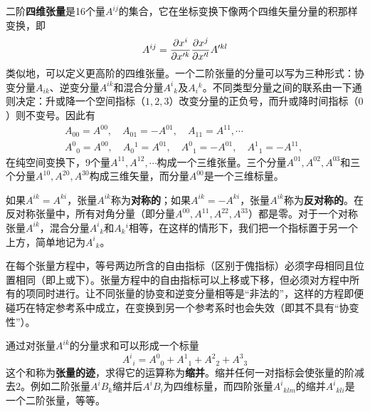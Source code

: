 二阶{\bf 四维张量}是16个量$A^{ij}$的集合，它在坐标变换下像两个四维矢量分量的积那样变换，即
\begin{equation}
	A^{ij} = \frac{\partial x^i}{\partial x'^k} \frac{\partial x^j}{\partial x'^l} A'^{kl}
\end{equation}
类似地，可以定义更高阶的四维张量。一个二阶张量的分量可以写为三种形式：协变分量$A_{ik}$、逆变分量$A^{ik}$和混合分量$A^i{}_k$及$A_i{}^k$。不同类型分量之间的联系由一下通则决定：升或降一个空间指标（$1,2,3$）改变分量的正负号，而升或降时间指标（$0$）则不变号。因此有
\begin{align*}
	& A_{00} = A^{00},\quad A_{01} = -A^{01},\quad A_{11} = A^{11},\cdots \\
	& A^0{}_0 = A^{00},\quad A_0{}^1 = A^{01},\quad A^0{}_1 = -A^{01},\quad A^1{}_1 = -A^{11},\quad 
\end{align*}
在纯空间变换下，9个量$A^{11},A^{12},\cdots$构成一个三维张量。三个分量$A^{01},A^{02},A^{03}$和三个分量$A^{10},A^{20},A^{30}$构成三维矢量，而分量$A^{00}$是一个三维标量。

如果$A^{ik} = A^{ki}$，张量$A^{ik}$称为{\bf 对称的}；如果$A^{ik} = -A^{ki}$，张量$A^{ik}$称为{\bf 反对称的}。在反对称张量中，所有对角分量（即分量$A^{00},A^{11},A^{22},A^{33}$）都是零。对于一个对称张量$A^{ik}$，混合分量$A^i{}_k$和$A_k{}^i$相等，在这样的情形下，我们把一个指标置于另一个上方，简单地记为$A^i{}_k$。

在每个张量方程中，等号两边所含的自由指标（区别于傀指标）必须字母相同且位置相同（即上或下）。张量方程中的自由指标可以上移或下移，但必须对方程中所有的项同时进行。让不同张量的协变和逆变分量相等是“非法的”，这样的方程即便碰巧在特定参考系中成立，在变换到另一个参考系时也会失效（即其不具有“协变性”）。

通过对张量$A^{ik}$的分量求和可以形成一个标量
\begin{equation*}
	A^i{}_i = A^0{}_0 + A^1{}_1 + A^2{}_2 + A^3{}_3
\end{equation*}
这个和称为{\bf 张量的迹}，求得它的运算称为{\bf 缩并}。缩并任何一对指标会使张量的阶减去$2$。例如二阶张量$A^iB_k$缩并后$A^iB_i$为四维标量，而四阶张量$A^i{}_{klm}$的缩并$A^i{}_{kli}$是一个二阶张量，等等。


